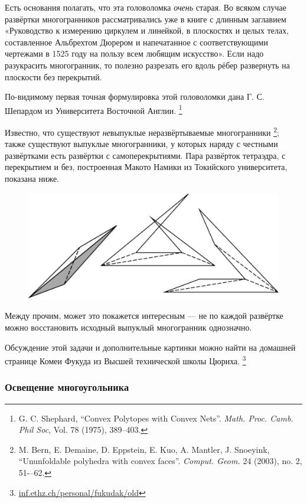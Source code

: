 Есть основания полагать, что эта головоломка \emph{очень} старая. 
Во всяком случае развёртки многогранников рассматривались уже в книге с длинным заглавием «Руководство к измерению циркулем и линейкой, в плоскостях и целых телах, составленное Альбрехтом Дюрером и напечатанное с соответствующими чертежами в 1525 году на пользу всем любящим искусство».
Если надо разукрасить многогранник, то полезно разрезать его вдоль рёбер развернуть на плоскости без перекрытий.

По-видимому первая точная формулировка этой головоломки дана Г. С. Шепардом из Университета Восточной Англии.%
\footnote{G. C. Shephard, ``Convex Polytopes with Convex Nets''. \emph{Math. Proc. Camb. Phil Soc}, Vol. 78 (1975), 389--403.}
 
Известно, что существуют \emph{не}выпуклые неразвёртываемые многогранники%
\footnote{M. Bern, E. Demaine, D. Eppstein, E. Kuo, A. Mantler, J. Snoeyink, 
``Ununfoldable polyhedra with convex faces''.
\emph{Comput. Geom.} 24 (2003), no. 2, 51-–62.};
также существуют выпуклые многогранники, у которых наряду с честными развёртками есть развёртки с самоперекрытиями. 
Пара развёрток тетраэдра, с перекрытием и без, построенная Макото Намики из Токийского университета, показана ниже.

\begin{figure}[h!]
\centering
\includegraphics[scale=0.5]{Figs/UnsolvedPuzzles/unfold}
\end{figure}

Между прочим, может это покажется интересным --- не по каждой развёртке можно восстановить исходный выпуклый многогранник однозначно. %

Обсуждение этой задачи и дополнительные картинки можно найти на домашней странице Комеи Фукуда из Высшей технической школы Цюриха.%
\footnote{\href{https://inf.ethz.ch/personal/fukudak/old/}{\url{inf.ethz.ch/personal/fukudak/old}}}

\subsubsection*{Освещение многоугольника}

